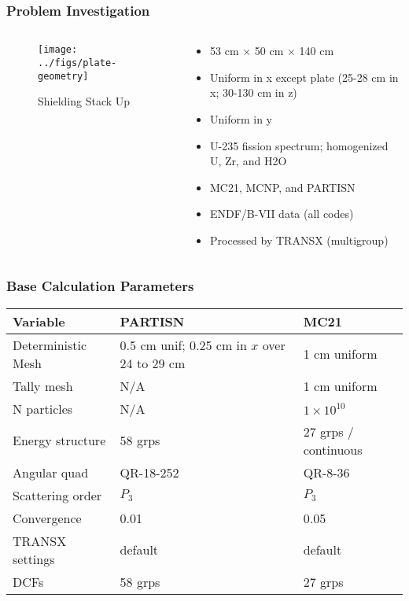 \documentclass[xcolor=x11names,compress]{beamer}
\renewcommand{\(}{\begin{columns}}
\renewcommand{\)}{\end{columns}}
\newcommand{\<}[1]{\begin{column}{#1}}
\renewcommand{\>}{\end{column}}
\begin{document}
\begin{frame}[fragile]
  \frametitle{Problem Investigation}
  	\begin{columns}
  	\begin{column}{0.45\textwidth}
  	\begin{figure}
  		\texttt{[image: ../figs/plate-geometry]}
  		\caption{Shielding Stack Up}
  	\end{figure}
  	\end{column}
 	\begin{column}{0.6\textwidth}
	\begin{itemize}
	\item 53 cm $\times$ 50 cm $\times$ 140 cm 
	\item Uniform in x except plate (25-28 cm in x; 30-130 cm in z)
	\item Uniform in y
	\item U-235 fission spectrum; homogenized U, Zr, and H2O
	\vspace*{1 em}
	\item MC21, MCNP, and PARTISN
	\item ENDF/B-VII data (all codes)
	\item Processed by TRANSX (multigroup)
	\end{itemize}
  	\end{column}
	\end{columns}
  
\end{frame}


\begin{frame}[fragile]
  \frametitle{Base Calculation Parameters}
  \begin{table}[p]
  \label{tab:calcParams}
  \begin{center}
    \begin{tabu}{| X | X | X |}\hline
      Variable & PARTISN & MC21\\\hline\hline
	Deterministic Mesh & 0.5 cm unif; 0.25 cm in $x$ over 24 to 29 cm & 1 cm uniform \\\hline
	Tally mesh & N/A & 1 cm uniform \\\hline
	N particles & N/A & $1 \times 10^{10}$\\\hline
	Energy structure & 58 grps & 27 grps / continuous\\\hline
	Angular quad & QR-18-252 & QR-8-36\\\hline
	Scattering order & $P_3$ & $P_3$\\\hline
	Convergence & 0.01 & 0.05\\\hline
	TRANSX settings & default & default\\\hline
	DCFs & 58 grps & 27 grps \\\hline
    \end{tabu}
  \end{center}
\end{table}
  
\end{frame}
\end{document}
